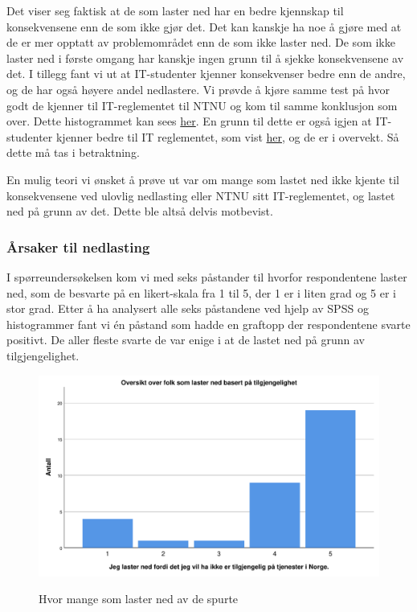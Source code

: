 Det viser seg faktisk at de som laster ned har en bedre kjennskap til konsekvensene enn de som ikke gjør det. Det kan kanskje ha noe å gjøre med at de er mer opptatt av problemområdet enn de som ikke laster ned. De som ikke laster ned i første omgang har kanskje ingen grunn til å sjekke konsekvensene av det. I tillegg fant vi ut at IT-studenter kjenner konsekvenser bedre enn de andre, og de har også høyere andel nedlastere. Vi prøvde å kjøre samme test på hvor godt de kjenner til IT-reglementet til NTNU \cite{ITReg} og kom til samme konklusjon som over. Dette histogrammet kan sees \hyperref[fig:reglement-lasterned]{her}. En grunn til dette er også igjen at IT-studenter kjenner bedre til IT reglementet, som vist \hyperref[fig:reglement-fakultet]{her}, og de er i overvekt. Så dette må tas i betraktning. 

En mulig teori vi ønsket å prøve ut var om mange som lastet ned ikke kjente til konsekvensene ved ulovlig nedlasting eller NTNU sitt IT-reglementet, og lastet ned på grunn av det. Dette ble altså delvis motbevist.

\subsubsection{Årsaker til nedlasting}
I spørreundersøkelsen kom vi med seks påstander til hvorfor respondentene laster ned, som de besvarte på en likert-skala fra 1 til 5, der 1 er i liten grad og 5 er i stor grad. Etter å ha analysert alle seks påstandene ved hjelp av SPSS og histogrammer fant vi én påstand som hadde en graftopp der respondentene svarte positivt. De aller fleste svarte de var enige i at de lastet ned på grunn av tilgjengelighet.

\begin{figure}[H]
    \centering
    \includegraphics[scale=0.45]{case_1/bilder/tilgjengelighet.pdf}
    \label{fig:tilgjengelighet}
    \caption[Tilgjengelighet]{Hvor mange som laster ned av de spurte}
\end{figure}

